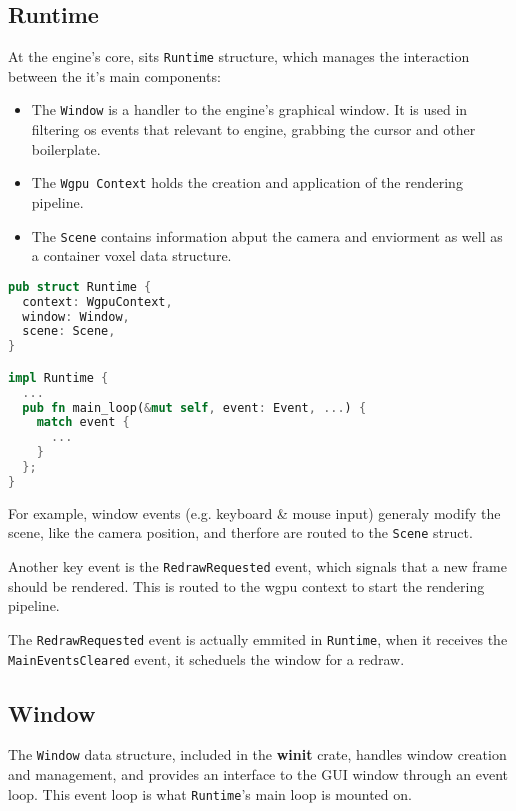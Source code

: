\subsection{Runtime}
\begin{samepage}
At the engine's core, sits \texttt{Runtime}  structure, which manages the interaction between the it's main components:
\begin{itemize}
  \item The \texttt{Window} is a handler to the engine's graphical window. It is used in filtering \acrshort{os} events that relevant to engine, grabbing the cursor and other boilerplate.
  \item The \texttt{Wgpu Context} holds the creation and application of the rendering pipeline.
  \item The \texttt{Scene} contains information abput the camera and enviorment as well as a container voxel data structure.
\end{itemize}
\end{samepage}

\begin{lstlisting}[language=rust,caption={Runtime definition},captionpos=b]
pub struct Runtime {
  context: WgpuContext,
  window: Window,
  scene: Scene,
}

impl Runtime {
  ...
  pub fn main_loop(&mut self, event: Event, ...) {
    match event {
      ...
    }
  };
}
\end{lstlisting}


For example, window events (e.g. keyboard \& mouse input) generaly modify the scene, like the camera position, and therfore are routed to the \verb|Scene| struct.

Another key event is the \verb|RedrawRequested| event, which signals that a new frame should be rendered. This is routed to the wgpu context to start the rendering pipeline.

The \verb|RedrawRequested| event is actually emmited in \verb|Runtime|, when it receives the \verb|MainEventsCleared| event, it scheduels the window for a redraw.

\subsection{Window}
The \verb|Window| data structure, included in the \textbf{winit}\supercite{winit:doc} crate, handles window creation and management, and provides an interface to the GUI window through an event loop. This event loop is what \verb|Runtime|'s main loop is mounted on.

